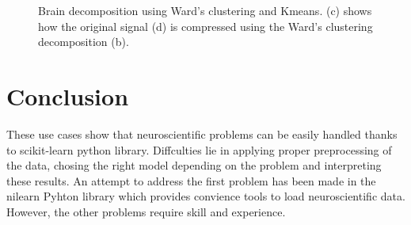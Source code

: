 \documentclass{frontiersSCNS} %
\newcounter{x}
\newcounter{y}
\begin{document}
\begin{figure}[hbtp]
  \begin{center}
  \end{center}
  \caption{Brain decomposition using Ward's clustering and Kmeans. (c) shows how the original
  signal (d) is compressed using the Ward's clustering decomposition (b).}
  \label{fig:clustering}
\end{figure}

\section{Conclusion}

These use cases show that neuroscientific problems can be easily handled thanks
to scikit-learn python library. Diffculties lie in applying proper preprocessing of
the data, chosing the right model depending on the problem and interpreting
these results. An attempt to
address the first problem has been made in the nilearn Pyhton library which
provides convience tools to load neuroscientific data. However, the other
problems require skill and experience.
\end{document}
